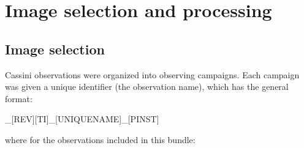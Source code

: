 
\section{Image selection and processing}
\label{sec:image-selection-and-processing}


\subsection{Image selection}
\label{sec:image-selection}

Cassini observations were organized into observing campaigns. Each campaign was given a unique identifier (the observation name), which has the general format:

\begin{CodeBlock}
[INST]_[REV][TI]_[UNIQUENAME]_[PINST]
\end{CodeBlock}

\noindent where for the observations included in this bundle:

